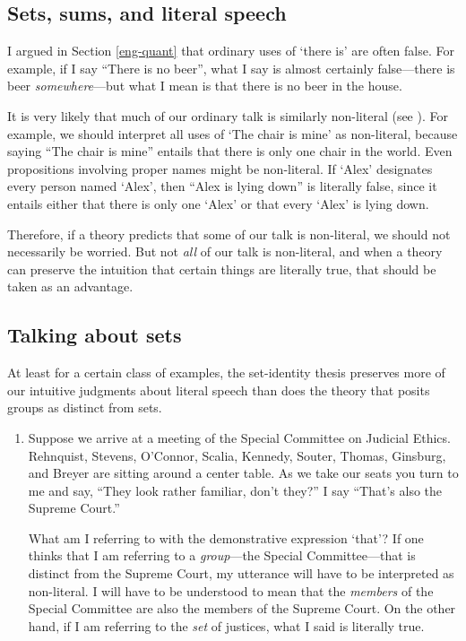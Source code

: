 \documentclass[12pt,twoside]{reedfancy}
\begin{document}
\begin{spacing}{1.25}
\section{Sets, sums, and literal speech}
\label{talk}
I argued in Section \ref{eng-quant} that ordinary uses of `there is'
are often false.  For example, if I say ``There is no beer'', what I
say is almost certainly false---there is beer {\em somewhere}---but
what I mean is that there is no beer in the house.

It is very likely that much of our ordinary talk is similarly
non-literal (see \citet{bach1987}).  For example, we should interpret
all uses of `The chair is mine' as non-literal, because saying ``The
chair is mine'' entails that there is only one chair in the world.
Even propositions involving proper names might be non-literal.  If
`Alex' designates every person named `Alex', then ``Alex is lying
down'' is literally false, since it entails either that there is only
one `Alex' or that every `Alex' is lying down.

Therefore, if a theory predicts that some of our talk is non-literal,
we should not necessarily be worried.  But not {\em all} of our talk
is non-literal, and when a theory can preserve the intuition that
certain things are literally true, that should be taken as an
advantage.

\subsection{Talking about sets}
\label{sets-talk}
At least for a certain class of examples, the set-identity thesis
preserves more of our intuitive judgments about literal speech than
does the theory that posits groups as distinct from sets.

\begin{enumerate}
  \item Suppose we arrive at a meeting of the Special Committee on
    Judicial Ethics.  Rehnquist, Stevens, O'Connor, Scalia, Kennedy,
    Souter, Thomas, Ginsburg, and Breyer are sitting around a center
    table.  As we take our seats you turn to me and say, ``They look
    rather familiar, don't they?''  I say ``That's also the Supreme
    Court.''

    What am I referring to with the demonstrative expression `that'?
    If one thinks that I am referring to a {\em group}---the Special
    Committee---that is distinct from the Supreme Court, my utterance
    will have to be interpreted as non-literal.  I will have to be
    understood to mean that the {\em members} of the Special Committee
    are also the members of the Supreme Court.  On the other hand, if
    I am referring to the {\em set} of justices, what I said is
    literally true.


\end{enumerate}
\end{spacing}
\end{document}
